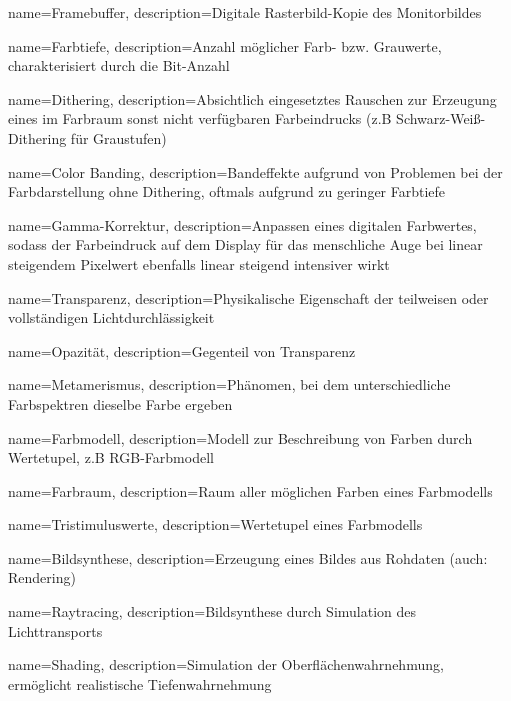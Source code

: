 {
  name=Framebuffer,
  description={Digitale Rasterbild-Kopie des Monitorbildes}
}

{
  name=Farbtiefe,
  description={Anzahl möglicher Farb- bzw. Grauwerte, charakterisiert durch die Bit-Anzahl}
}

{
  name=Dithering,
  description={Absichtlich eingesetztes Rauschen zur Erzeugung eines im Farbraum sonst nicht verfügbaren Farbeindrucks (z.B Schwarz-Weiß-Dithering für Graustufen)}
}

{
  name=Color Banding,
  description={Bandeffekte aufgrund von Problemen bei der Farbdarstellung ohne Dithering, oftmals aufgrund zu geringer Farbtiefe}
}

{
  name=Gamma-Korrektur,
  description={Anpassen eines digitalen Farbwertes, sodass der Farbeindruck auf dem Display für das menschliche Auge bei linear steigendem Pixelwert ebenfalls linear steigend intensiver wirkt}
}

{
  name=Transparenz,
  description={Physikalische Eigenschaft der teilweisen oder vollständigen Lichtdurchlässigkeit}
}

{
  name=Opazität,
  description={Gegenteil von Transparenz}
}

{
  name=Metamerismus,
  description={Phänomen, bei dem unterschiedliche Farbspektren dieselbe Farbe ergeben}
}

{
  name=Farbmodell,
  description={Modell zur Beschreibung von Farben durch Wertetupel, z.B RGB-Farbmodell}
}

{
  name=Farbraum,
  description={Raum aller möglichen Farben eines Farbmodells}
}

{
  name=Tristimuluswerte,
  description={Wertetupel eines Farbmodells}
}

{
  name=Bildsynthese,
  description={Erzeugung eines Bildes aus Rohdaten (auch: Rendering)}
}

{
  name=Raytracing,
  description={Bildsynthese durch Simulation des Lichttransports}
}

{
  name=Shading,
  description={Simulation der Oberflächenwahrnehmung, ermöglicht realistische Tiefenwahrnehmung}
}

